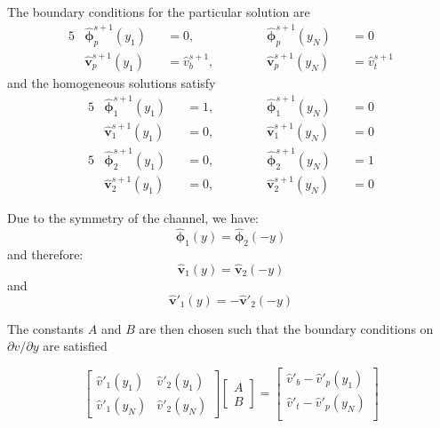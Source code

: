 \documentclass[titlepage,12pt,letter]{article}
\numberwithin{equation}{section}
\begin{document}
The boundary conditions for the particular solution are
\begin{alignat*}{5}
	&\hat{\bm{\phi}}_{p}^{s+1}\left(y_{1}\right)&&=0, &&\quad &&\hat{\bm{\phi}}_{p}^{s+1}\left(y_{N}\right)&&=0 \\
	&\hat{\bm{v}}_{p}^{s+1}\left(y_{1}\right)&&=\hat{{v}}_{b}^{s+1}, &&\quad &&\hat{\bm{v}}_{p}^{s+1}\left(y_{N}\right)&&=\hat{{v}}_{t}^{s+1}
\end{alignat*}
and the homogeneous solutions satisfy
\begin{alignat*}{5}
	&\hat{\bm{\phi}}_{1}^{s+1}\left(y_{1}\right)&&=1, &&\quad &&\hat{\bm{\phi}}_{1}^{s+1}\left(y_{N}\right)&&=0 \\
	&\hat{\bm{v}}_{1}^{s+1}\left(y_{1}\right)&&=0, &&\quad &&\hat{\bm{v}}_{1}^{s+1}\left(y_{N}\right)&&=0
\end{alignat*}
\begin{alignat*}{5}
	&\hat{\bm{\phi}}_{2}^{s+1}\left(y_{1}\right)&&=0, &&\quad &&\hat{\bm{\phi}}_{2}^{s+1}\left(y_{N}\right)&&=1 \\
	&\hat{\bm{v}}_{2}^{s+1}\left(y_{1}\right)&&=0, &&\quad &&\hat{\bm{v}}_{2}^{s+1}\left(y_{N}\right)&&=0
\end{alignat*}

Due to the symmetry of the channel, we have:
\begin{equation*}
	\hat{\bm{\phi}}_1(y) = \hat{\bm{\phi}}_2(-y)
\end{equation*}
and therefore:
\begin{equation*}
	\hat{\bm{v}}_1(y) = \hat{\bm{v}}_2(-y)
\end{equation*}
and
\begin{equation*}
	\hat{\bm{v}}'_1(y) = -\hat{\bm{v}}'_2(-y)
\end{equation*}

The constants $A$ and $B$ are then chosen such that the boundary conditions on $\partial v / \partial y$ are satisfied

\begin{equation*}
	\renewcommand{\arraystretch}{2}
\begin{bmatrix}
	\hat{v}'_1\left(y_{1}\right) & \hat{v}'_2\left(y_{1}\right) \\
	\hat{v}'_1\left(y_{N}\right) & \hat{v}'_2\left(y_{N}\right)
\end{bmatrix}
\begin{bmatrix}
	A\\ B
\end{bmatrix}
=
\begin{bmatrix}
	\hat{v}'_b-\hat{v}'_p\left(y_{1}\right) \\
	\hat{v}'_t-\hat{v}'_p\left(y_{N}\right) \\
\end{bmatrix}
\end{equation*}
\end{document}
